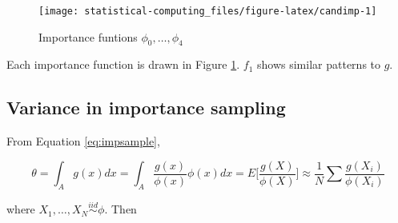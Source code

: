 \documentclass[]{book}
\newenvironment{Shaded}{\begin{snugshade}}{\end{snugshade}}
\newcommand{\DataTypeTok}[1]{\textcolor[rgb]{0.13,0.29,0.53}{#1}}
\newcommand{\DecValTok}[1]{\textcolor[rgb]{0.00,0.00,0.81}{#1}}
\newcommand{\FloatTok}[1]{\textcolor[rgb]{0.00,0.00,0.81}{#1}}
\newcommand{\KeywordTok}[1]{\textcolor[rgb]{0.13,0.29,0.53}{\textbf{#1}}}
\newcommand{\NormalTok}[1]{#1}
\newcommand{\OperatorTok}[1]{\textcolor[rgb]{0.81,0.36,0.00}{\textbf{#1}}}
\newcommand{\StringTok}[1]{\textcolor[rgb]{0.31,0.60,0.02}{#1}}
\theoremstyle{definition}
\theoremstyle{definition}
\theoremstyle{definition}
\theoremstyle{remark}
\begin{document}
\begin{Shaded}
\end{Shaded}

\begin{figure}[H]

{\centering \texttt{[image: statistical-computing\_files/figure-latex/candimp-1]} 

}

\caption{Importance funtions $\phi_0, \ldots, \phi_4$}\label{fig:candimp}
\end{figure}

Each importance function is drawn in Figure \ref{fig:candimp}. \(f_1\) shows similar patterns to \(g\).

\hypertarget{variance-in-importance-sampling}{%
\subsection{Variance in importance sampling}\label{variance-in-importance-sampling}}

From Equation \eqref{eq:impsample},

\[\theta = \int_A g(x)dx = \int_A \frac{g(x)}{\phi(x)}\phi(x) dx = E\bigg[ \frac{g(X)}{\phi(X)} \bigg] \approx \frac{1}{N} \sum \frac{g(X_i)}{\phi(X_i)}\]

where \(X_1, \ldots, X_N \stackrel{iid}{\sim}\phi\). Then
\end{document}
